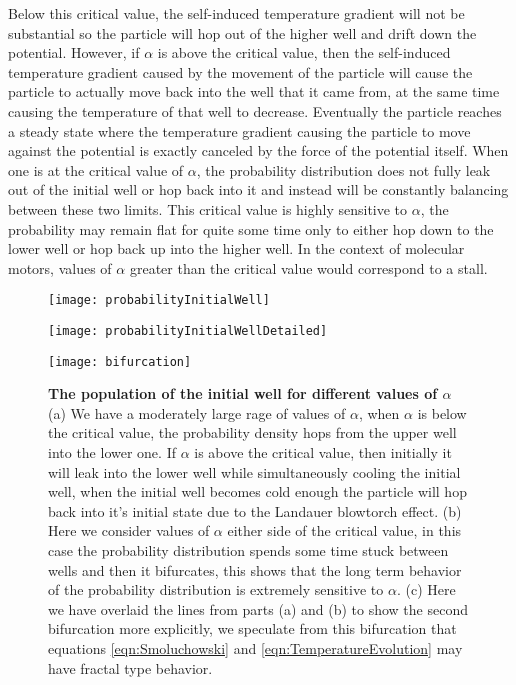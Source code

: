 Below this critical value, the self-induced temperature gradient will not be substantial so the particle will hop out of the higher well and drift down the potential. However, if $\alpha$ is above the critical value, then the self-induced temperature gradient caused by the movement of the particle will cause the particle to actually move back into the well that it came from, at the same time causing the temperature of that well to decrease. Eventually the particle reaches a steady state where the temperature gradient causing the particle to move against the potential is exactly canceled by the force of the potential itself. When one is at the critical value of $\alpha$, the probability distribution does not fully leak out of the initial well or hop back into it and instead will be constantly balancing between these two limits. This critical value is highly sensitive to $\alpha$, the probability may remain flat for quite some time only to either hop down to the lower well or hop back up into the higher well. In the context of molecular motors, values of $\alpha$ greater than the critical value would correspond to a stall.

\begin{figure}
	\begin{minipage}{0.49\textwidth}
		\texttt{[image: probabilityInitialWell]}
		\subcaption{}
	\end{minipage}
	\begin{minipage}{0.49\textwidth}
		\texttt{[image: probabilityInitialWellDetailed]}
		\subcaption{}
	\end{minipage}
	
	\begin{minipage}{\textwidth}
		\center
		\texttt{[image: bifurcation]}
		\subcaption{}
	\end{minipage}
	\caption{\textbf{The population of the initial well for different values of $\alpha$} (a) We have a moderately large rage of values of $\alpha$, when $\alpha$ is below the critical value, the probability density hops from the upper well into the lower one. If $\alpha$ is above the critical value, then initially it will leak into the lower well while simultaneously cooling the initial well, when the initial well becomes cold enough the particle will hop back into it's initial state due to the Landauer blowtorch effect. (b) Here we consider values of $\alpha$ either side of the critical value, in this case the probability distribution spends some time stuck between wells and then it bifurcates, this shows that the long term behavior of the probability distribution is extremely sensitive to $\alpha$. (c) Here we have overlaid the lines from parts (a) and (b) to show the second bifurcation more explicitly, we speculate from this bifurcation that equations \ref{eqn:Smoluchowski} and \ref{eqn:TemperatureEvolution} may have fractal type behavior. \label{fig:alphaCritical}}
\end{figure}


